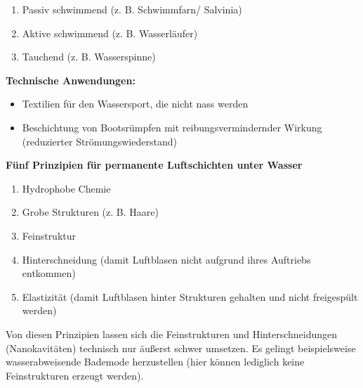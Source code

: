 \begin{enumerate}
    \item Passiv schwimmend (z. B. Schwimmfarn/ Salvinia)
    \item Aktive schwimmend (z. B. Wasserläufer)
    \item Tauchend (z. B. Wasserspinne)
\end{enumerate}
\textbf{Technische Anwendungen:}

\begin{itemize}
    \item Textilien für den Wassersport, die nicht nass werden \dangersign
    \item Beschichtung von Bootsrümpfen mit reibungsvermindernder Wirkung (reduzierter Strömungswiederstand)
\end{itemize}
\textbf{Fünf Prinzipien für permanente Luftschichten unter Wasser} \dangersign

\begin{enumerate}
    \item Hydrophobe Chemie
    \item Grobe Strukturen (z. B. Haare)
    \item Feinstruktur
    \item Hinterschneidung (damit Luftblasen  nicht aufgrund ihres Auftriebs entkommen)
    \item Elastizität (damit Luftblasen hinter Strukturen gehalten und nicht freigespült werden)
\end{enumerate}
Von diesen Prinzipien lassen sich die Feinstrukturen und Hinterschneidungen (Nanokavitäten) technisch nur äußerst schwer umsetzen. Es gelingt beispielsweise wasserabweisende Bademode herzustellen (hier können lediglich keine Feinstrukturen erzeugt werden).

